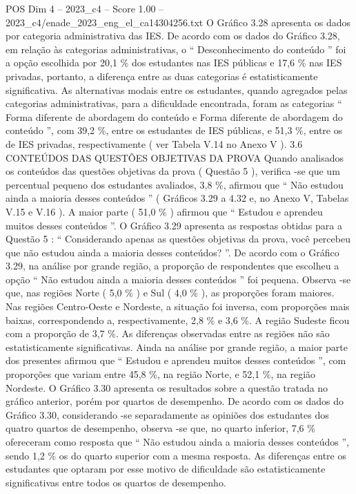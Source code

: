 \begin{textsample}{POS Dim 4 – 2023\_c4 – Score 1.00 – 2023\_c4/enade\_2023\_eng\_el\_ca14304256.txt}
O Gráfico 3.28 apresenta os dados por categoria administrativa das IES.
De acordo com os dados do Gráfico 3.28, em relação às categorias administrativas, o “ Desconhecimento do conteúdo ” foi a opção escolhida por 20,1 \% dos estudantes nas IES públicas e 17,6 \% nas IES privadas, portanto, a diferença entre as duas categorias é estatisticamente significativa.
As alternativas modais entre os estudantes, quando agregados pelas categorias administrativas, para a dificuldade encontrada, foram as categorias “ Forma diferente de abordagem do conteúdo e Forma diferente de abordagem do conteúdo ”, com 39,2 \%, entre os estudantes de IES públicas, e 51,3 \%, entre os de IES privadas, respectivamente ( ver Tabela V.14 no Anexo V ). 3.6 CONTEÚDOS DAS QUESTÕES OBJETIVAS DA PROVA Quando analisados os conteúdos das questões objetivas da prova ( Questão 5 ), verifica -se que um percentual pequeno dos estudantes avaliados, 3,8 \%, afirmou que “ Não estudou ainda a maioria desses conteúdos ” ( Gráficos 3.29 a 4.32 e, no Anexo V, Tabelas V.15 e V.16 ).
A maior parte ( 51,0 \% ) afirmou que “ Estudou e aprendeu muitos desses conteúdos ”.
O Gráfico 3.29 apresenta as respostas obtidas para a Questão 5 : “ Considerando apenas as questões objetivas da prova, você percebeu que não estudou ainda a maioria desses conteúdos? ”.
De acordo com o Gráfico 3.29, na análise por grande região, a proporção de respondentes que escolheu a opção “ Não estudou ainda a maioria desses conteúdos ” foi pequena.
Observa -se que, nas regiões Norte ( 5,0 \% ) e Sul ( 4,0 \% ), as proporções foram maiores.
Nas regiões Centro-Oeste e Nordeste, a situação foi inversa, com proporções mais baixas, correspondendo a, respectivamente, 2,8 \% e 3,6 \%.
A região Sudeste ficou com a proporção de 3,7 \%.
As diferenças observadas entre as regiões não são estatisticamente significativas.
Ainda na análise por grande região, a maior parte dos presentes afirmou que “ Estudou e aprendeu muitos desses conteúdos ”, com proporções que variam entre 45,8 \%, na região Norte, e 52,1 \%, na região Nordeste.
O Gráfico 3.30 apresenta os resultados sobre a questão tratada no gráfico anterior, porém por quartos de desempenho.
De acordo com os dados do Gráfico 3.30, considerando -se separadamente as opiniões dos estudantes dos quatro quartos de desempenho, observa -se que, no quarto inferior, 7,6 \% ofereceram como resposta que “ Não estudou ainda a maioria desses conteúdos ”, sendo 1,2 \% os do quarto superior com a mesma resposta.
As diferenças entre os estudantes que optaram por esse motivo de dificuldade são estatisticamente significativas entre todos os quartos de desempenho.

\end{textsample}
